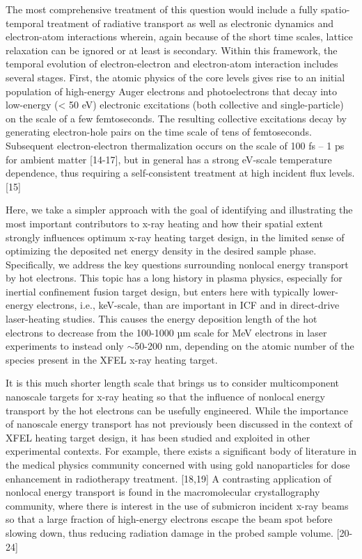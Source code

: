The most comprehensive treatment of this question would include a fully
spatio-temporal treatment of radiative transport as well as electronic
dynamics and electron-atom interactions wherein, again because of the
short time scales, lattice relaxation can be ignored or at least is
secondary. Within this framework, the temporal evolution of
electron-electron and electron-atom interaction includes several stages.
First, the atomic physics of the core levels gives rise to an initial
population of high-energy Auger electrons and photoelectrons that decay
into low-energy (\textless{} 50 eV) electronic excitations (both
collective and single-particle) on the scale of a few femtoseconds. The
resulting collective excitations decay by generating electron-hole pairs
on the time scale of tens of femtoseconds. Subsequent electron-electron
thermalization occurs on the scale of 100 fs -- 1 ps for ambient matter
{[}14-17{]}, but in general has a strong eV-scale temperature
dependence, thus requiring a self-consistent treatment at high incident
flux levels.{[}15{]}

Here, we take a simpler approach with the goal of identifying and
illustrating the most important contributors to x-ray heating and how
their spatial extent strongly influences optimum x-ray heating target
design, in the limited sense of optimizing the deposited net energy
density in the desired sample phase. Specifically, we address the key
questions surrounding nonlocal energy transport by hot electrons. This
topic has a long history in plasma physics, especially for inertial
confinement fusion target design, but enters here with typically
lower-energy electrons, i.e., keV-scale, than are important in ICF and
in direct-drive laser-heating studies. This causes the energy deposition
length of the hot electrons to decrease from the 100-1000 µm scale for
MeV electrons in laser experiments to instead only
$\sim$50-200 nm, depending on the atomic number of the
species present in the XFEL x-ray heating target.

It is this much shorter length scale that brings us to consider
multicomponent nanoscale targets for x-ray heating so that the influence
of nonlocal energy transport by the hot electrons can be usefully
engineered. While the importance of nanoscale energy transport has not
previously been discussed in the context of XFEL heating target design,
it has been studied and exploited in other experimental contexts. For
example, there exists a significant body of literature in the medical
physics community concerned with using gold nanoparticles for dose
enhancement in radiotherapy treatment. {[}18,19{]} A contrasting
application of nonlocal energy transport is found in the macromolecular
crystallography community, where there is interest in the use of
submicron incident x-ray beams so that a large fraction of high-energy
electrons escape the beam spot before slowing down, thus reducing
radiation damage in the probed sample volume. {[}20-24{]}

